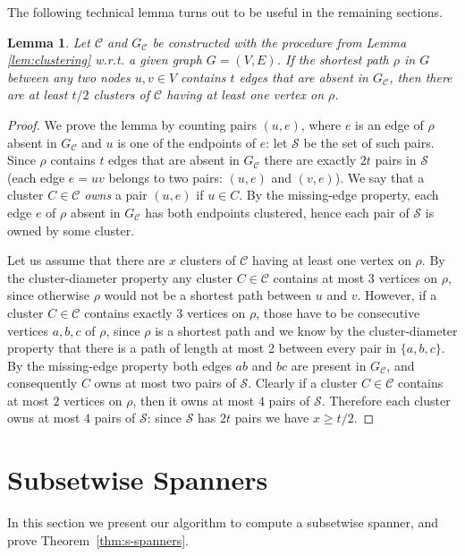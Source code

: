 \documentclass[a4paper,11pt]{article}
\newtheorem{lemma}{Lemma}[section]
\theoremstyle{definition}
\newcommand{\cC}{\mathcal{C}}
\newcommand{\cS}{\mathcal{S}}
\begin{document}
The following technical lemma turns out to be useful in the remaining sections.
\begin{lemma}
\label{lem:num-clusters}
Let $\cC$ and $G_\cC$ be constructed with the procedure from Lemma \ref{lem:clustering} w.r.t. a given graph $G=(V,E)$. If the shortest path $\rho$ in $G$ between any two nodes $u,v\in V$ contains $t$ edges that are absent in $G_\cC$, 
then there are at least $t/2$ clusters of $\cC$
having at least one vertex on $\rho$.
\end{lemma}

\begin{proof}
We prove the lemma by counting pairs $(u,e)$, where $e$ is an edge of $\rho$
absent in $G_\cC$ and $u$ is one of the endpoints of $e$: let $\cS$ be the set of such pairs.
Since $\rho$ contains $t$ edges that are absent in $G_\cC$ there are exactly $2t$
pairs in $\cS$ (each edge $e = uv$ belongs to two pairs: 
$(u,e)$ and $(v,e)$).
We say that a cluster $C \in \cC$ {\em owns} a pair $(u,e)$ if $u \in C$.
By the missing-edge property, each edge $e$ of $\rho$ absent in $G_\cC$ has both endpoints clustered,
hence each pair of $\cS$ is owned by some cluster.

Let us assume that there are $x$ clusters of $\cC$ having
at least one vertex on $\rho$.
By the cluster-diameter property any cluster $C \in \cC$ contains at most $3$ vertices on $\rho$,
since otherwise $\rho$ would not be a shortest path between $u$ and $v$.
However, if a cluster $C \in \cC$ contains exactly $3$ vertices on $\rho$,
those have to be consecutive vertices $a,b,c$ of $\rho$, since $\rho$ is a shortest path and we know by the cluster-diameter property that there is a path of length at most 2 between every 
pair in $\{a,b,c\}$. By the missing-edge property
both edges $ab$ and $bc$ are present in $G_\cC$, and consequently $C$
owns at most two pairs of $\cS$.
Clearly if a cluster $C \in \cC$ contains at most $2$ vertices on $\rho$,
then it owns at most $4$ pairs of $\cS$.
Therefore each cluster owns at most $4$ pairs of $\cS$:  
since $\cS$ has $2t$ pairs we have $x \ge t/2$.
\end{proof}

\section{Subsetwise Spanners}
\label{section-s-spanners}

In this section we present our algorithm to compute a subsetwise spanner, and prove Theorem~\ref{thm:s-spanners}. 
\end{document}
